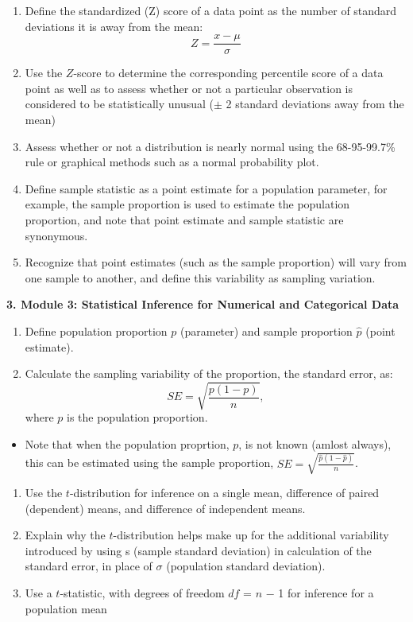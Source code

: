 \documentclass[
]{article}
\providecommand{\tightlist}{%
  \setlength{\itemsep}{0pt}\setlength{\parskip}{0pt}}
\begin{document}
\begin{enumerate}
\def\labelenumi{\arabic{enumi}.}
\tightlist
\item
  Define the standardized (Z) score of a data point as the number of
  standard deviations it is away from the mean:
  \[Z = \frac{x-\mu}{\sigma}\]
\item
  Use the \(Z\)-score to determine the corresponding percentile score of
  a data point as well as to assess whether or not a particular
  observation is considered to be statistically unusual (\(\pm\) 2
  standard deviations away from the mean)
\item
  Assess whether or not a distribution is nearly normal using the
  68-95-99.7\% rule or graphical methods such as a normal probability
  plot.
\item
  Define sample statistic as a point estimate for a population
  parameter, for example, the sample proportion is used to estimate the
  population proportion, and note that point estimate and sample
  statistic are synonymous.
\item
  Recognize that point estimates (such as the sample proportion) will
  vary from one sample to another, and define this variability as
  sampling variation.
\end{enumerate}

\textbf{3. Module 3: Statistical Inference for Numerical and Categorical
Data}

\begin{enumerate}
\def\labelenumi{\arabic{enumi}.}
\tightlist
\item
  Define population proportion \(p\) (parameter) and sample proportion
  \(\hat{p}\) (point estimate).
\item
  Calculate the sampling variability of the proportion, the standard
  error, as: \[ SE= \sqrt{\frac{p(1-p)}{n}}, \] where \(p\) is the
  population proportion.
\end{enumerate}

\begin{itemize}
\tightlist
\item
  Note that when the population proprtion, \(p\), is not known (amlost
  always), this can be estimated using the sample proportion,
  \(SE = \sqrt{\frac{\hat{p}(1-\hat{p})}{n}}\).
\end{itemize}

\begin{enumerate}
\def\labelenumi{\arabic{enumi}.}
\setcounter{enumi}{2}
\tightlist
\item
  Use the \(t\)-distribution for inference on a single mean, difference
  of paired (dependent) means, and difference of independent means.
\item
  Explain why the \(t\)-distribution helps make up for the additional
  variability introduced by using s (sample standard deviation) in
  calculation of the standard error, in place of \(\sigma\) (population
  standard deviation).
\item
  Use a \(t\)-statistic, with degrees of freedom \(df\) = \(n\) − 1 for
  inference for a population mean
\end{enumerate}
\end{document}

